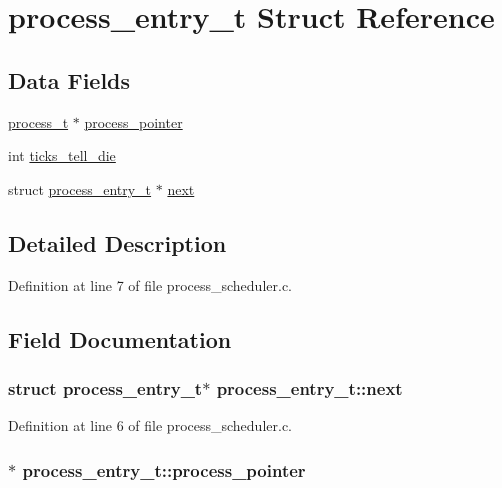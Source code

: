 \hypertarget{structprocess__entry__t}{
\section{process\_\-entry\_\-t Struct Reference}
\label{structprocess__entry__t}
}
\subsection*{Data Fields}
\begin{DoxyCompactItemize}
\item 
\hyperlink{structprocess__structure}{process\_\-t} $\ast$ \hyperlink{structprocess__entry__t_a09514884c903815408323f1b4f0563b1}{process\_\-pointer}
\item 
int \hyperlink{structprocess__entry__t_a4f8e8fb3d475e2c7583490cd962fcff5}{ticks\_\-tell\_\-die}
\item 
struct \hyperlink{structprocess__entry__t}{process\_\-entry\_\-t} $\ast$ \hyperlink{structprocess__entry__t_a42f5184c4206374918805ddc48d72920}{next}
\end{DoxyCompactItemize}


\subsection{Detailed Description}


Definition at line 7 of file process\_\-scheduler.c.



\subsection{Field Documentation}
\hypertarget{structprocess__entry__t_a42f5184c4206374918805ddc48d72920}{
\subsubsection[{next}]{\setlength{\rightskip}{0pt plus 5cm}struct {\bf process\_\-entry\_\-t}$\ast$ {\bf process\_\-entry\_\-t::next}}}
\label{structprocess__entry__t_a42f5184c4206374918805ddc48d72920}


Definition at line 6 of file process\_\-scheduler.c.

\hypertarget{structprocess__entry__t_a09514884c903815408323f1b4f0563b1}{
\subsubsection[{process\_\-pointer}]{$\ast$ {\bf process\_\-entry\_\-t::process\_\-pointer}}}
\label{structprocess__entry__t_a09514884c903815408323f1b4f0563b1}


